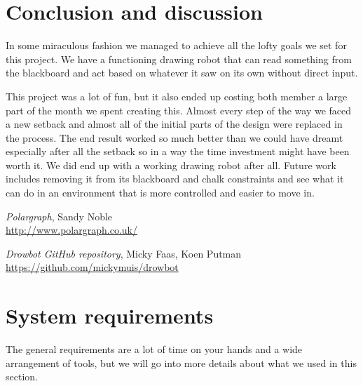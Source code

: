 \documentclass[12pt]{article}
\begin{document}
\section{Conclusion and discussion}
\label{sec:conclusion}

In some miraculous fashion we managed to achieve all the lofty goals
we set for this project.
We have a functioning drawing robot that can read something from
the blackboard and act based on whatever it saw on its own without
direct input.

This project was a lot of fun, but it also ended up costing both
member a large part of the month we spent creating this.
Almost every step of the way we faced a new setback and almost all
of the initial parts of the design were replaced in the process.
The end result worked so much better than we could have dreamt
especially after all the setback so in a way the time investment
might have been worth it.
We did end up with a working drawing robot after all.
Future work includes removing it from its blackboard and chalk
constraints and see what it can do in an environment that is
more controlled and easier to move in.


\begin{thebibliography}{9}

  \textit{Polargraph}, Sandy Noble
  \\\url{http://www.polargraph.co.uk/}

  \textit{Drowbot GitHub repository}, Micky Faas, Koen Putman
  \\\url{https://github.com/mickymuis/drowbot}

\end{thebibliography}



\clearpage
\appendix

\section{System requirements}
\label{sec:sysreq}
The general requirements are a lot of time on your hands and a wide
arrangement of tools, but we will go into more details about what
we used in this section.

\end{document}
